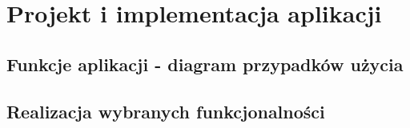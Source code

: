 \chapter{Projekt i implementacja aplikacji}

\section{Funkcje aplikacji - diagram przypadków użycia}

\section{Realizacja wybranych funkcjonalności}